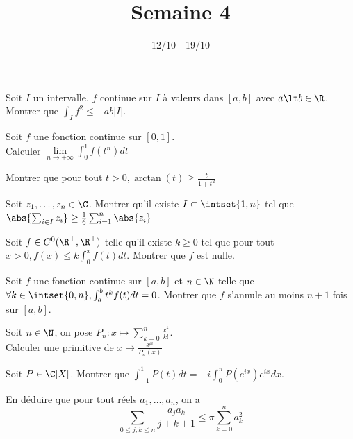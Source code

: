 \documentclass[11pt,a4paper]{article}
\begin{document}
\title{Semaine 4}
\author{}
\date{12/10 - 19/10 }

\maketitle


\begin{exercise}
Soit $I$ un intervalle, $f$ continue sur $I$ à valeurs dans $[a,b]$ avec $a\lt b\in\R$.\\
Montrer que $\displaystyle\int_If^2\le-ab|I|$.
\end{exercise}

\begin{exercise}
Soit $f$ une fonction continue sur $[0,1]$.\\
Calculer $\lim\limits_{n\to+\infty}\int_0^1f(t^n)dt$
\end{exercise}

\begin{exercise}
Montrer que pour tout $t\gt0, \arctan(t)\ge\frac{t}{1+t^2}$
\end{exercise}

\begin{exercise}
Soit $z_1,\ldots, z_n\in\C$. Montrer qu'il existe $I\subset\intset{1,n}$ tel que $\abs{\sum_{i\in I}z_i}\ge\frac{1}{6}\sum_{i=1}^n\abs{z_i}$
\end{exercise}

\begin{exercise}
Soit $f\in C^0(\R^+,\R^+)$ telle qu'il existe $k\ge0$ tel que pour tout $x\gt0, f(x)\le k\int_0^xf(t)dt$.
Montrer que $f$ est nulle.
\end{exercise}

\begin{exercise}
Soit $f$ une fonction continue sur $[a,b]$ et $n\in\N$ telle que $\forall k\in\intset{0,n},\int_a^bt^kf(t)dt=0$.
Montrer que $f$ s'annule au moins $n+1$ fois sur $[a,b]$.
\end{exercise}

\begin{exercise}
Soit $n\in\N$, on pose $P_n:x\mapsto\sum_{k=0}^n\frac{x^k}{k!}$.\\
Calculer une primitive de $x\mapsto\frac{x^n}{P_n(x)}$
\end{exercise}

\begin{exercise}
\begin{questions}
\item Soit $P\in\C[X]$. Montrer que $\int_{-1}^1P(t)dt=-i\int_0^{\pi}P(e^{ix})e^{ix}dx$.
\item En déduire que pour tout réels $a_1,\ldots,a_n$, on a
$$\sum_{0\le j,k\le n}\frac{a_ja_k}{j+k+1}\le\pi\sum_{k=0}^na_k^2$$
\end{questions}
\end{exercise}
\end{document}
